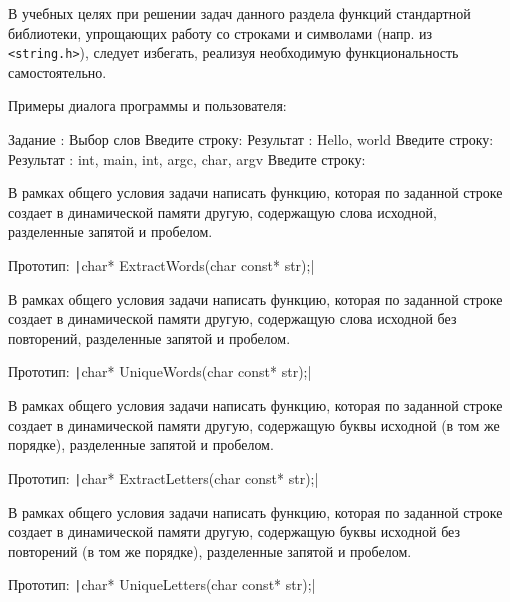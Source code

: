В учебных целях при решении задач данного раздела функций стандартной
библиотеки, упрощающих работу со строками и символами (напр. из 
\texttt{<string.h>}), следует избегать, реализуя необходимую
функциональность самостоятельно.

Примеры диалога программы и пользователя:

\begin{zzoutput}
  Задание : Выбор слов
  Введите строку: 
  Результат     : Hello, world
  Введите строку: 
  Результат     : int, main, int, argc, char, argv
  Введите строку: \zzuser{ }
\end{zzoutput}


\bigskip


\begin{zztask}
В рамках общего условия задачи написать функцию, которая по заданной строке
создает в динамической памяти другую, содержащую слова исходной,
разделенные запятой и пробелом.

Прототип: \texttt|char* ExtractWords(char const* str);|
\end{zztask}

\begin{zztask}
В рамках общего условия задачи написать функцию, которая по заданной строке
создает в динамической памяти другую, содержащую слова исходной без
повторений, разделенные запятой и пробелом.

Прототип: \texttt|char* UniqueWords(char const* str);|
\end{zztask}

\begin{zztask}
В рамках общего условия задачи написать функцию, которая по заданной строке
создает в динамической памяти другую, содержащую буквы исходной (в том же
порядке), разделенные запятой и пробелом.

Прототип: \texttt|char* ExtractLetters(char const* str);|
\end{zztask}

\begin{zztask}
В рамках общего условия задачи написать функцию, которая по заданной строке
создает в динамической памяти другую, содержащую буквы исходной без
повторений (в том же порядке), разделенные запятой и пробелом.

Прототип: \texttt|char* UniqueLetters(char const* str);|
\end{zztask}

